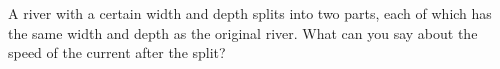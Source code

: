         A river with a certain width and depth splits into two parts, each of which
        has the same width and depth as the original river. What can you say about the
        speed of the current after the split?

